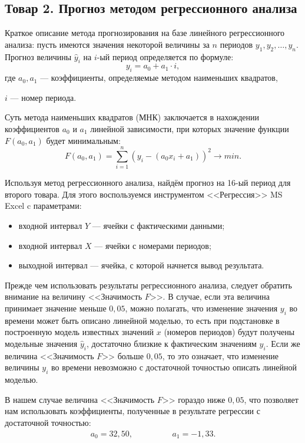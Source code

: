 \subsection{Товар 2. Прогноз методом регрессионного анализа}

Краткое описание метода прогнозирования на базе линейного регрессионного анализа:
пусть имеются значения некоторой величины за $n$ периодов $y_1, y_2, \dots, y_n$.
Прогноз величины $\hat{y}_{i}$ на $i$-ый период определяется по формуле:
\[
  y_{i} = a_0 + a_1 \cdot i,
\]
где \hspace{2mm} $a_0, a_1$ --- коэффициенты, определяемые методом наименьших квадратов, \par
                 $i$ --- номер периода.

Суть метода наименьших квадратов (МНК) заключается в нахождении
коэффициентов $a_0$ и $a_1$ линейной зависимости, при которых
значение функции $F(a_0, a_1)$ будет минимальным:
\[
  F(a_0, a_1) = \sum_{i=1}^{n} (y_i - (a_0 x_i + a_1))^2 \rightarrow min.
\]

Используя метод регрессионного анализа, найдём прогноз на 16-ый период
для второго товара. Для этого воспользуемся инструментом
<<Регрессия>> MS Excel c параметрами:
\begin{itemize}
  \item входной интервал $Y$ --- ячейки с фактическими данными;
  \item входной интервал $X$ --- ячейки с номерами периодов;
  \item выходной интервал --- ячейка, с которой начнется вывод результата.
\end{itemize}

Прежде чем использовать результаты регрессионного анализа,
следует обратить внимание на величину <<Значимость $F$>>. В случае, если
эта величина принимает значение меньше $0{,}05$, можно полагать, что
изменение значения $y_i$ во времени может быть описано линейной моделью, то
есть при подстановке в построенную модель известных значений $x$ (номеров периодов)
будут получены модельные значения $\hat{y}_i$, достаточно близкие к фактическим
значениям $y_i$. Если же величина <<Значимость $F$>> больше $0{,}05$, то
это означает, что изменение величины $y_i$ во времени невозможно с достаточной
точностью описать линейной моделью.

В нашем случае величина <<Значимость $F$>> гораздо ниже $0,05$, что позволяет
нам использовать коэффициенты, полученные в результате регрессии с достаточной точностью:
\begin{align*}
  a_0 = 32{,}50, \hspace{2cm} a_1 = - 1{,}33.
\end{align*}


